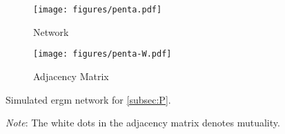 \begin{figure}[t]
	\centering
	\begin{subfigure}{0.31\textwidth}
		\centering
		\texttt{[image: figures/penta.pdf]}
		\caption{Network}
	\end{subfigure}
	\begin{subfigure}{0.31\textwidth}
		\centering
		\texttt{[image: figures/penta-W.pdf]}
		\caption{Adjacency Matrix}
	\end{subfigure}
	\caption{Simulated \acrshort{ergm} network for \autoref{subsec:P}.}
	\label{fig:P}
	\caption*{\footnotesize\emph{Note}: The white dots in the adjacency matrix denotes mutuality.}
\end{figure}
